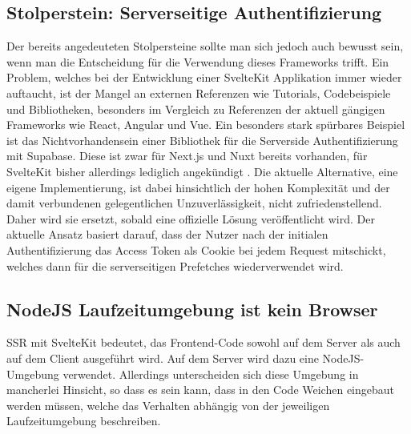\subsection{Stolperstein: Serverseitige Authentifizierung}
Der bereits angedeuteten Stolpersteine sollte man sich jedoch auch bewusst sein, wenn man die Entscheidung für die Verwendung dieses Frameworks trifft. Ein Problem, welches bei der Entwicklung einer SvelteKit Applikation immer wieder auftaucht, ist der Mangel an externen Referenzen wie Tutorials, Codebeispiele und Bibliotheken, besonders im Vergleich zu Referenzen der aktuell gängigen Frameworks wie React, Angular und Vue. Ein besonders stark spürbares Beispiel ist das Nichtvorhandensein einer Bibliothek für die Serverside Authentifizierung mit Supabase. Diese ist zwar für Next.js und Nuxt bereits vorhanden, für SvelteKit bisher allerdings lediglich angekündigt \cite[vgl.][]{Schaeff2022}. Die aktuelle Alternative, eine eigene Implementierung, ist dabei hinsichtlich der hohen Komplexität und der damit verbundenen gelegentlichen Unzuverlässigkeit, nicht zufriedenstellend. Daher wird sie ersetzt, sobald eine offizielle Lösung veröffentlicht wird. Der aktuelle Ansatz basiert darauf, dass der Nutzer nach der initialen Authentifizierung das Access Token als Cookie bei jedem Request mitschickt, welches dann für die serverseitigen Prefetches wiederverwendet wird.
\subsection{NodeJS Laufzeitumgebung ist kein Browser}
SSR mit SvelteKit bedeutet, das Frontend-Code sowohl auf dem Server als auch auf dem Client ausgeführt wird. Auf dem Server wird dazu eine NodeJS-Umgebung verwendet. Allerdings unterscheiden sich diese Umgebung in mancherlei Hinsicht, so dass es sein kann, dass in den Code Weichen eingebaut werden müssen, welche das Verhalten abhängig von der jeweiligen Laufzeitumgebung beschreiben.
